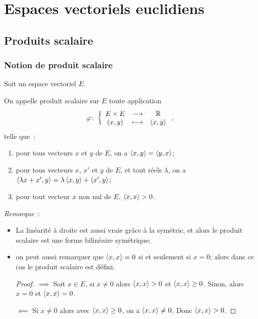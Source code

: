 \chapter{Espaces vectoriels euclidiens}
\label{chap:espaceseuclidiens}
\minitoc
\minilof
\minilot

\section{Produits scalaire}

\subsection{Notion de produit scalaire}

Soit un espace vectoriel $E$.
\begin{defdef}
  On appelle produit scalaire sur $E$ toute application
  \begin{equation}
    \varphi\colon \left\{\begin{array}{ccc} E \times E & \longrightarrow &\mathbb{R}\\ (x,y) & \longmapsto & \left\langle{x},{y}\right\rangle \end{array} \right.,
  \end{equation}
  telle que~:
  \begin{enumerate}
  \item pour tous vecteurs $x$ et $y$ de $E$, on a $\left\langle{x},{y}\right\rangle=\left\langle{y},{x}\right\rangle$;
  \item pour tous vecteurs $x$, $x'$ et $y$ de $E$, et tout réels $\lambda$, on a $\left\langle{\lambda x +x'},{y}\right\rangle = \lambda\left\langle{x},{y}\right\rangle + \left\langle{x'},{y}\right\rangle$;
  \item pour tout vecteur $x$ non nul de $E$, $\left\langle{x},{x}\right\rangle>0$.
  \end{enumerate}
\end{defdef}
\emph{Remarque}~:
\begin{itemize}
\item La linéarité à droite est aussi vraie grâce à la symétrie, et alors le produit scalaire est une forme bilinéaire symétrique;
\item on peut aussi remarquer que $\left\langle{x},{x}\right\rangle=0$ si et seulement si $x=0$; alors dans ce cas le produit scalaire est défini.
  \begin{proof}
    $\implies$ Soit $x \in E$, si $x\neq 0$ alors $\left\langle{x},{x}\right\rangle>0$ et $\left\langle{x},{x}\right\rangle\geq 0$. Sinon, alors $x=0$ et $\left\langle{x},{x}\right\rangle=0$.

    $\impliedby$ Si $x \neq 0$ alors avec $\left\langle{x},{x}\right\rangle\geq 0$, on a $\left\langle{x},{x}\right\rangle \neq 0$. Donc $\left\langle{x},{x}\right\rangle>0$.
  \end{proof}
\end{itemize}

